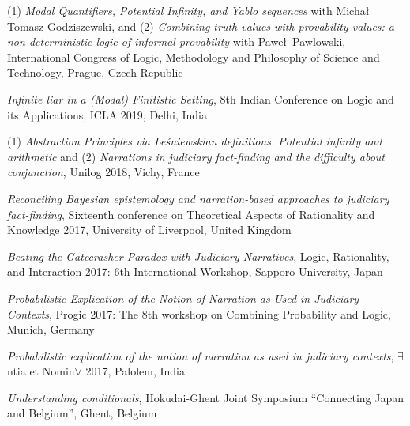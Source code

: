 \documentclass[10pt, a4paper]{article}
\newcommand{\years}[1]{\marginnote{\normalsize #1}}
\begin{document}
\years{2019} (1) \emph{Modal Quantifiers, Potential Infinity, and Yablo sequences} with Micha\l\, Tomasz Godziszewski, and (2) \emph{Combining truth values with provability values: a non-deterministic logic of informal provability} with Pawe\l\, Pawlowski, International Congress of Logic, Methodology and Philosophy of Science and Technology, Prague, Czech Republic


\years{2018}

\emph{Infinite liar in a (Modal) Finitistic Setting}, 8th Indian Conference on Logic and its Applications, ICLA 2019, Delhi, India

\vspace{0.5mm}

(1) \emph{Abstraction Principles via Le{\'s}niewskian definitions. Potential infinity and arithmetic} and (2) \emph{Narrations in judiciary fact-finding and the difficulty about conjunction}, Unilog 2018, Vichy, France

\years{2017} \emph{Reconciling Bayesian epistemology and narration-based approaches to judiciary fact-finding},   Sixteenth conference on
Theoretical Aspects of Rationality and Knowledge 2017, University of Liverpool, United Kingdom


\vspace{0.5mm}


\emph{Beating the Gatecrasher Paradox with Judiciary Narratives},
Logic, Rationality, and Interaction 2017: 6th International Workshop, Sapporo University, Japan



\vspace{0.5mm}


 \emph{Probabilistic Explication of the Notion of Narration as Used in Judiciary Contexts}, Progic 2017: The 8th workshop on Combining Probability and Logic,  Munich, Germany



\vspace{0.5mm}

\emph{Probabilistic explication of the notion of narration as used in judiciary contexts}, $\exists$ntia et Nomin$\forall$ 2017,  Palolem, India


\vspace{0.5mm}


\years{2016} \emph{Understanding conditionals}, Hokudai-Ghent Joint Symposium “Connecting Japan and Belgium”,  Ghent, Belgium


\vspace{0.5mm}
\end{document}
